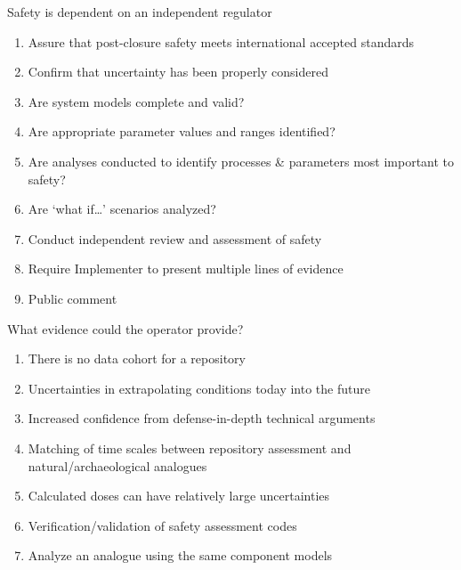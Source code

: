 \documentclass[aspectratio=1610,pdftex,dvipsnames,compress,xcolor={dvipsnames}]{beamer}
\begin{document}
\begin{frame}{Safety is dependent on an independent regulator}
    \begin{enumerate}[series=outerlist,topsep=0pt,itemsep=11pt,leftmargin=*,label=(\arabic*)]
        \item[]Assure that post-closure safety meets international accepted standards
        \item[]Confirm that uncertainty has been properly considered
        \item[]Are system models complete and valid?
        \item[]Are appropriate parameter values and ranges identified?
        \item[]Are analyses conducted to identify processes \& parameters most important to safety?
        \item[]Are `what if\ldots' scenarios analyzed?
        \item[]Conduct independent review and assessment of safety
        \item[]Require Implementer to present multiple lines of evidence
        \item[]Public comment
    \end{enumerate}
\end{frame}


\begin{frame}{What evidence could the operator provide?}
    \begin{enumerate}[series=outerlist,topsep=0pt,itemsep=21pt,leftmargin=*,label=(\arabic*)]
        \item[]There is no data cohort for a repository
        \item[]Uncertainties in extrapolating conditions today into the future
        \item[]Increased confidence from defense-in-depth technical arguments
        \item[]Matching of time scales between repository assessment and natural/archaeological analogues
        \item[]Calculated doses can have relatively large uncertainties
        \item[]Verification/validation of safety assessment codes 
        \item[]Analyze an analogue using the same component models
    \end{enumerate}
\end{frame}
\end{document}
